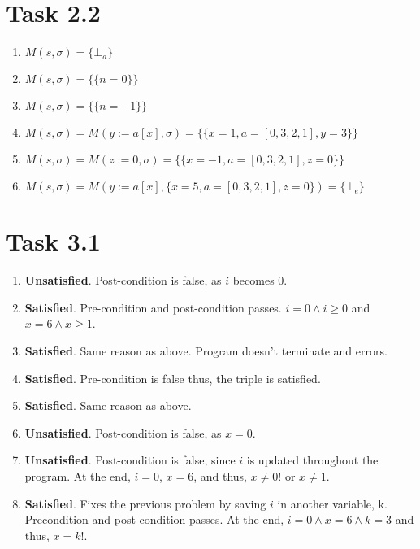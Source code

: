 \documentclass{article}
\begin{document}
	\section{Task 2.2}
		\begin{enumerate}[label = {(\alph*)}]
			
			\item $M(s, \sigma) = \{\bot_{d} \}$
			
			\item $M(s, \sigma) = \{ \{n = 0\}\}$
			
			\item $M(s, \sigma) = \{ \{n = -1\}\}$
			
			\item $M(s, \sigma) = M(y := a[x], \sigma) = \{ \{x = 1, a = [0, 3, 2, 1], y = 3 \}\}$
			
			\item $M(s, \sigma) = M(z := 0, \sigma) = \{ \{x = -1, a = [0, 3, 2, 1], z = 0\}\}$
			
			\item $M(s, \sigma) = M(y := a[x], \{x = 5, a = [0, 3, 2, 1], z = 0\}) = \{\bot_{e}\}$
			
		\end{enumerate}
	
	\pagebreak
	
	\section{Task 3.1}
		\begin{enumerate}[label = {(\alph*)}]
			
			\item \textbf{Unsatisfied}. Post-condition is false, as $i$ becomes 0. 
			
			\item \textbf{Satisfied}. Pre-condition and post-condition passes. $i = 0 \land i \geq 0$ and $x = 6 \land x \geq 1$.
			
			\item \textbf{Satisfied}. Same reason as above. Program doesn't terminate and errors.
			
			\item \textbf{Satisfied}. Pre-condition is false thus, the triple is satisfied.
			
			\item \textbf{Satisfied}. Same reason as above.
			
			\item \textbf{Unsatisfied}. Post-condition is false, as $x = 0$.
			
			\item \textbf{Unsatisfied}. Post-condition is false, since $i$ is updated throughout the program. At the end, $i = 0$, $x = 6$, and thus, $x \neq 0!$ or $x \neq 1$.
			
			\item \textbf{Satisfied}. Fixes the previous problem by saving $i$ in another variable, k. Precondition and post-condition passes. At the end, $i = 0 \land x = 6 \land k = 3$ and thus, $x = k!$.
			
		\end{enumerate}
	
\end{document}
